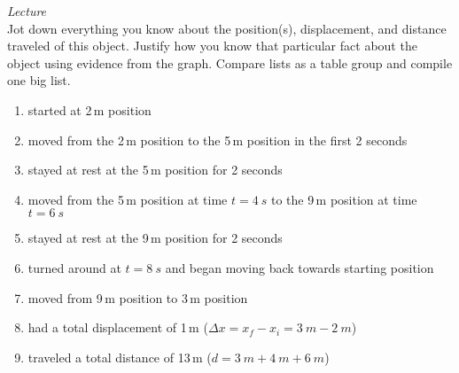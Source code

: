 \documentclass[dvipsnames]{exam}
\begin{document}
\begin{questions}

\question 
\textit{Lecture}\\
Jot down everything you know about the position(s), displacement, and distance traveled of this object. Justify how you know that particular fact about the object using evidence from the graph. Compare lists as a table group and compile one big list. 

\begin{center}
\end{center}

\begin{solution}
    \phantom{.}
    \begin{enumerate}
        \item started at 2\,m position
        \item moved from the 2\,m position to the 5\,m position in the first 2 seconds
        \item stayed at rest at the 5\,m position for 2 seconds
        \item moved from the 5\,m position at time $t = \SI{4}{s}$ to the 9\,m position at time $t = \SI{6}{s}$
        \item stayed at rest at the 9\,m position for 2 seconds
        \item turned around at $t = \SI{8}{s}$ and began moving back towards starting position
        \item moved from 9\,m position to 3\,m position
        \item had a total displacement of 1\,m ($\Delta x = x_f - x_i = \SI{3}{m} - \SI{2}{m}$)
        \item traveled a total distance of 13\,m ($d = \SI{3}{m} + \SI{4}{m} + \SI{6}{m}$)


\end{enumerate}
\end{solution}
\end{questions}
\end{document}

